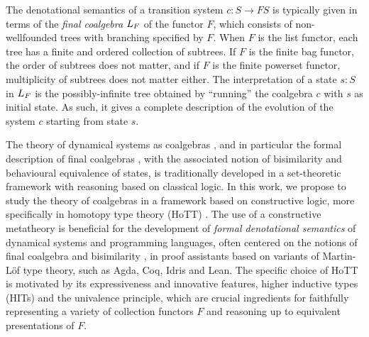 \documentclass[final,a4paper,USenglish,cleveref]{lipics-v2021}
\begin{document}
The denotational semantics of a transition system $c : S \to F S$ is typically given in terms of the \emph{final coalgebra} $\Lim{F}$ of the functor $F$, which  consists of non-wellfounded trees with branching specified by $F$. When $F$ is the list functor, each tree has a finite and ordered collection of subtrees. If $F$ is the finite bag functor, the order of subtrees does not matter, and if $F$ is the finite powerset functor, multiplicity of subtrees does not matter either. %
The interpretation of a state $s : S$ in $\Lim{F}$ is the possibly-infinite tree obtained by ``running'' the coalgebra $c$ with $s$ as initial state. As such, it gives a complete description of the evolution of the system $c$ starting from state $s$.

The theory of dynamical systems as coalgebras \cite{Rutten2000,Jacobs2016}, and in particular the formal description of final coalgebras \cite{Barr1993,Adamek1995,Worrell2005}, with the associated notion of bisimilarity and behavioural equivalence of states, is traditionally developed in a set-theoretic framework with reasoning based on classical logic. In this work, we propose to study the theory of coalgebras in a framework based on constructive logic, more specifically in homotopy type theory (HoTT) \cite{HoTTBook}. The use of a constructive metatheory is beneficial for the development of \emph{formal denotational semantics} of dynamical systems and programming languages, often centered on the notions of final coalgebra and bisimilarity \cite{Turi1997}, in proof assistants based on variants of Martin-L{\"o}f type theory, such as Agda, Coq, Idris and Lean. The specific choice of HoTT is motivated by its expressiveness and innovative features, higher inductive types (HITs) and the univalence principle, which are crucial ingredients for faithfully representing a variety of collection functors $F$ and reasoning up to equivalent presentations of $F$.
\end{document}
